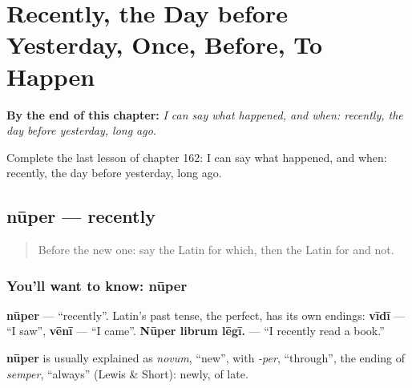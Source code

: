 
\chapter{Recently, the Day before Yesterday, Once, Before, To Happen}
\label{ch:la-recently-the-day-before-yesterday-once-before-to-happen}

\begin{chapteropening}
\textbf{By the end of this chapter:} \emph{I can say what happened, and when: recently, the day before yesterday, long ago.}

Complete the last lesson of chapter 162: I can say what happened, and when: recently, the day before yesterday, long ago.
\end{chapteropening}

\section[nūper]{nūper — recently}

\label{lesson:LA-C162-nuper}



\begin{quote}
Before the new one: say the Latin for which, then the Latin for and not.
\end{quote}

\subsection*{You'll want to know: nūper}
\textbf{nūper} — \textquotedblleft{}recently\textquotedblright{}. Latin's past tense, the perfect, has its own endings: \textbf{vīdī} — \textquotedblleft{}I saw\textquotedblright{}, \textbf{vēnī} — \textquotedblleft{}I came\textquotedblright{}. \textbf{Nūper librum lēgī.} — \textquotedblleft{}I recently read a book.\textquotedblright{}

\begin{cousinweb}
\textbf{nūper} is usually explained as \emph{novum}, \textquotedblleft{}new\textquotedblright{}, with \emph{-per}, \textquotedblleft{}through\textquotedblright{}, the ending of \emph{semper}, \textquotedblleft{}always\textquotedblright{} (Lewis \& Short): newly, of late.
\end{cousinweb}

